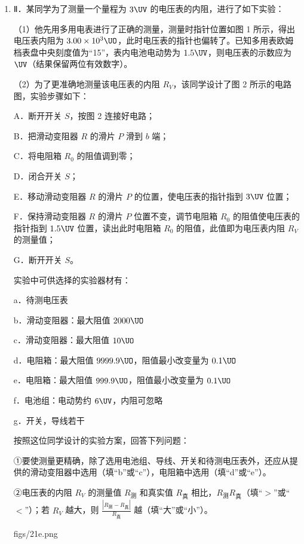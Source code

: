 \documentclass[\gkver]{gaokaozhenti}
\begin{document}
\begin{enumerate}
\begin{enumerate}
	\item
	Ⅱ．某同学为了测量一个量程为 $3\UV$ 的电压表的内阻，进行了如下实验：

	（1）他先用多用电表进行了正确的测量，测量时指针位置如图 1 所示，得出电压表内阻为 $3.00\times10^{3}\UO$，此时电压表的指针也偏转了。已知多用表欧姆档表盘中央刻度值为“15”，表内电池电动势为 $1.5\UV$，则电压表的示数应为$\UV$（结果保留两位有效数字）。

	（2）为了更准确地测量该电压表的内阻 $R_{V}$，该同学设计了图 2 所示的电路图，实验步骤如下：

	A．断开开关 $S$，按图 2 连接好电路；

	B．把滑动变阻器 $R$ 的滑片 $P$ 滑到 $b$ 端；

	C．将电阻箱 $R_{0}$ 的阻值调到零；

	D．闭合开关 $S$；

	E．移动滑动变阻器 $R$ 的滑片 $P$ 的位置，使电压表的指针指到 $3\UV$ 位置；

	F．保持滑动变阻器 $R$ 的滑片 $P$ 位置不变，调节电阻箱 $R_{0}$ 的阻值使电压表的指针指到 $1.5\UV$ 位置，读出此时电阻箱 $R_{0}$ 的阻值，此值即为电压表内阻 $R_{V}$ 的测量值；

	G．断开开关 $S$。

	实验中可供选择的实验器材有：

	a．待测电压表

	b．滑动变阻器：最大阻值 $2000\UO$

	c．滑动变阻器：最大阻值 $10\UO$

	d．电阻箱：最大阻值 $9999.9\UO$，阻值最小改变量为 $0.1\UO$

	e．电阻箱：最大阻值 $999.9\UO$，阻值最小改变量为 $0.1\UO$

	f．电池组：电动势约 $6\UV$，内阻可忽略

	g．开关，导线若干

	按照这位同学设计的实验方案，回答下列问题：

	①要使测量更精确，除了选用电池组、导线、开关和待测电压表外，还应从提供的滑动变阻器中选用（填“b”或“c”），电阻箱中选用（填“d”或“e”）。

	②电压表的内阻 $R_{V}$ 的测量值 $R_{\text{测}}$ 和真实值 $R_{\text{真}}$ 相比，$R_{\text{测}}$\tkanswer[0.8cm]{$>$}$R_{\text{真}}$（填“$>$”或“$<$”）；若 $R_{V}$ 越大，则 $\frac{|R_{\text{测}}-R_{\text{真}}|}{R_{\text{真}}}$ 越（填“大”或“小”）。

	{figs/21e.png}
\end{enumerate}
\end{enumerate}
\end{document}
